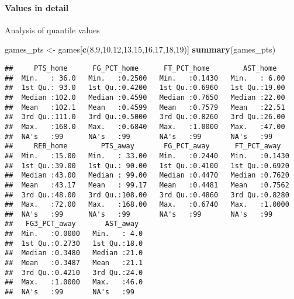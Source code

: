 \documentclass[
]{article}
\newenvironment{Shaded}{\begin{snugshade}}{\end{snugshade}}
\newcommand{\DecValTok}[1]{\textcolor[rgb]{0.00,0.00,0.81}{#1}}
\newcommand{\KeywordTok}[1]{\textcolor[rgb]{0.13,0.29,0.53}{\textbf{#1}}}
\newcommand{\NormalTok}[1]{#1}
\newcommand{\StringTok}[1]{\textcolor[rgb]{0.31,0.60,0.02}{#1}}
\begin{document}
\hypertarget{values-in-detail-1}{%
\paragraph{Values in detail}\label{values-in-detail-1}}

Analysis of quantile values

\begin{Shaded}
\begin{Highlighting}[]
\NormalTok{games\_pts \textless{}{-}}\StringTok{ }\NormalTok{games[}\KeywordTok{c}\NormalTok{(}\DecValTok{8}\NormalTok{,}\DecValTok{9}\NormalTok{,}\DecValTok{10}\NormalTok{,}\DecValTok{12}\NormalTok{,}\DecValTok{13}\NormalTok{,}\DecValTok{15}\NormalTok{,}\DecValTok{16}\NormalTok{,}\DecValTok{17}\NormalTok{,}\DecValTok{18}\NormalTok{,}\DecValTok{19}\NormalTok{)]}
\KeywordTok{summary}\NormalTok{(games\_pts)}
\end{Highlighting}
\end{Shaded}

\begin{verbatim}
##     PTS_home      FG_PCT_home      FT_PCT_home        AST_home    
##  Min.   : 36.0   Min.   :0.2500   Min.   :0.1430   Min.   : 6.00  
##  1st Qu.: 93.0   1st Qu.:0.4200   1st Qu.:0.6960   1st Qu.:19.00  
##  Median :102.0   Median :0.4590   Median :0.7650   Median :22.00  
##  Mean   :102.1   Mean   :0.4599   Mean   :0.7579   Mean   :22.51  
##  3rd Qu.:111.0   3rd Qu.:0.5000   3rd Qu.:0.8260   3rd Qu.:26.00  
##  Max.   :168.0   Max.   :0.6840   Max.   :1.0000   Max.   :47.00  
##  NA's   :99      NA's   :99       NA's   :99       NA's   :99     
##     REB_home        PTS_away       FG_PCT_away      FT_PCT_away    
##  Min.   :15.00   Min.   : 33.00   Min.   :0.2440   Min.   :0.1430  
##  1st Qu.:39.00   1st Qu.: 90.00   1st Qu.:0.4100   1st Qu.:0.6920  
##  Median :43.00   Median : 99.00   Median :0.4470   Median :0.7620  
##  Mean   :43.17   Mean   : 99.17   Mean   :0.4481   Mean   :0.7562  
##  3rd Qu.:48.00   3rd Qu.:108.00   3rd Qu.:0.4860   3rd Qu.:0.8280  
##  Max.   :72.00   Max.   :168.00   Max.   :0.6740   Max.   :1.0000  
##  NA's   :99      NA's   :99       NA's   :99       NA's   :99      
##   FG3_PCT_away       AST_away   
##  Min.   :0.0000   Min.   : 4.0  
##  1st Qu.:0.2730   1st Qu.:18.0  
##  Median :0.3480   Median :21.0  
##  Mean   :0.3487   Mean   :21.1  
##  3rd Qu.:0.4210   3rd Qu.:24.0  
##  Max.   :1.0000   Max.   :46.0  
##  NA's   :99       NA's   :99
\end{verbatim}
\end{document}
